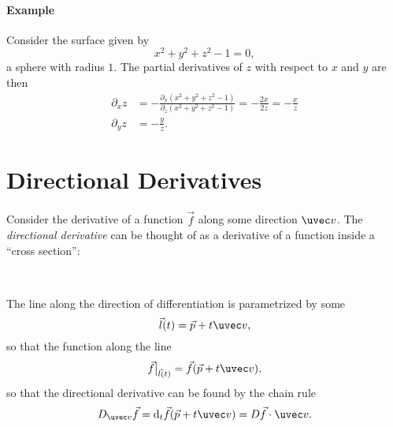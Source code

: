 \documentclass{multi}
\begin{document}
\paragraph{Example}

Consider the surface given by 
\[
    x^2 + y^2 + z^2 - 1 = 0,
\]
a sphere with radius \(1\). The partial derivatives of \(z\) with respect to \(x\) and \(y\) are then
\begin{align*}
    \partial_x z &= - \frac{\partial_x (x^2 + y^2 + z^2 - 1)}{\partial_z (x^2 + y^2 + z^2 - 1)} = - \frac{2x}{2z} = - \frac x z \\
    \partial_y z &= - \frac y z.
\end{align*}





\section*{Directional Derivatives}


Consider the derivative of a function \(\vec f\) along some direction \(\uvec v\). The \emph{directional derivative} can be thought of as a derivative of a function inside a ``cross section'':
\begin{center}
     \\
    \begin{tikzpicture}
        
    \end{tikzpicture}
\end{center}

The line along the direction of differentiation is parametrized by some
\[
    \vec l(t) = \vec p + t \uvec v,
\]
so that the function along the line
\[
    \vec f \big|_{\vec l(t)} = \vec f(\vec p + t \uvec v),
\]
so that the directional derivative can be found by the chain rule
\[
    D_{\uvec v} \vec f = \mathrm d_t \vec f(\vec p + t \uvec v) = D \vec f \cdot \uvec v.
\]
\end{document}
